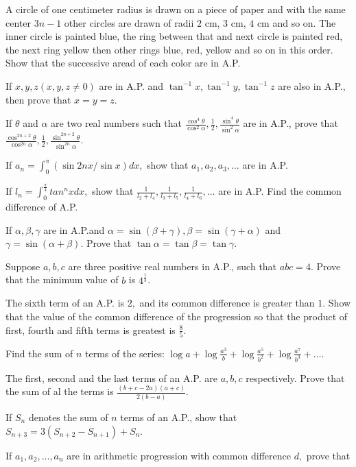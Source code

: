 \item A circle of one centimeter radius is drawn on a piece of paper and with the same center $3n - 1$ other circles are
  drawn of radii $2$ cm, $3$ cm, $4$ cm and so on. The inner circle is painted blue, the ring between that and next circle is
  painted red, the next ring yellow then other rings blue, red, yellow and so on in this order. Show that the successive aread of
  each color are in A.P.
\item If $x, y, z(x, y, z\neq 0)$ are in A.P. and $\tan^{-1}x, \tan^{-1}y, \tan^{-1}z$ are also in A.P., then prove that
  $x = y = z$.
\item If $\theta$ and $\alpha$ are two real numbers such that $\frac{\cos^4\theta}{\cos^2\alpha}, \frac{1}{2},
  \frac{\sin^4\theta}{\sin^2\alpha}$ are in A.P., prove that $\frac{\cos^{2n + 2}\theta}{\cos^{2n}\alpha}, \frac{1}{2},
  \frac{\sin^{2n + 2}\theta}{\sin^{2n}\alpha}$.
\item If $a_n = \displaystyle\int_0^\pi (\sin 2nx/\sin x)dx,$ show that $a_1, a_2, a_3, \ldots$ are in A.P.
\item If $l_n = \displaystyle\int_0^{\frac{\pi}{4}}tan^nxdx,$ show that $\frac{1}{l_2 + l_4}, \frac{1}{l_3 + l_5}, \frac{1}{l_4 + l_6},
  \ldots$ are in A.P. Find the common difference of A.P.
\item If $\alpha, \beta, \gamma$ are in A.P.and $\alpha = \sin(\beta + \gamma), \beta = \sin(\gamma + \alpha)$ and $\gamma
  = \sin(\alpha + \beta).$ Prove that $\tan \alpha = \tan \beta = \tan \gamma$.
\item Suppose $a, b, c$ are three positive real numbers in A.P., such that $abc = 4.$ Prove that the minimum value of $b$
  is $4^{\frac{1}{3}}$.
\item The sixth term of an A.P. is $2,$ and its common difference is greater than $1.$ Show that the value of the common
  difference of the progression so that the product of first, fourth and fifth terms is greatest is $\frac{8}{5}$.
\item Find the sum of $n$ terms of the series: $\log a + \log\frac{a^3}{b} + \log \frac{a^5}{b^2} + \log \frac{a^7}{b^3} +
  \ldots$.
\item The first, second and the last terms of an A.P. are $a,b, c$ respectively. Prove that the sum of al the terms is
  $\frac{(b + c - 2a)(a + c)}{2(b - a)}$.
\item If $S_n$ denotes the sum of $n$ terms of an A.P., show that $S_{n + 3} = 3(S_{n + 2} - S_{n + 1}) + S_n$.
\item If $a_1, a_2, \ldots, a_n$ are in arithmetic progression with common difference $d,$ prove that

